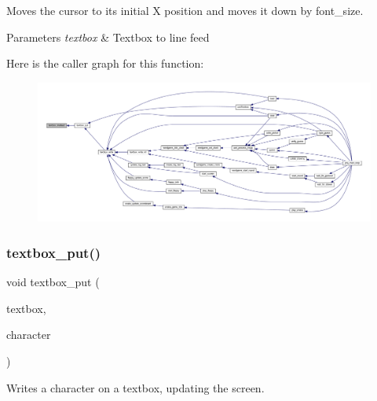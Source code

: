 Moves the cursor to its initial X position and moves it down by font\+\_\+size. 


\begin{DoxyParams}{Parameters}
{\em textbox} & Textbox to line feed \\
\hline
\end{DoxyParams}
Here is the caller graph for this function\+:\nopagebreak
\begin{figure}[H]
\begin{center}
\leavevmode
\includegraphics[width=350pt]{group__textbox_gae11fcc3afd300a03b3793eb4ec418207_icgraph}
\end{center}
\end{figure}
\mbox{\label{group__textbox_gab3ac8e604e6b7f8b6b4666d687a09716}} 
\subsubsection{\texorpdfstring{textbox\+\_\+put()}{textbox\_put()}}
{\footnotesize\ttfamily void textbox\+\_\+put (\begin{DoxyParamCaption}\item[{\mbox{\hyperlink{struct_text_box}{Text\+Box}} $\ast$}]{textbox,  }\item[{char}]{character }\end{DoxyParamCaption})}



Writes a character on a textbox, updating the screen. 


